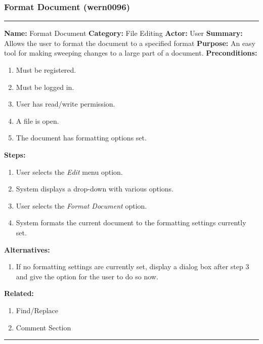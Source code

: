 \documentclass[11pt]{report}
\begin{document}
\subsubsection{Format Document (wern0096)}
\vspace{2pt}
\hrule
\vspace{8pt}
	\noindent\textbf{Name:} Format Document \newline
	\textbf{Category:} File Editing \newline
	\textbf{Actor:} User \newline
	\textbf{Summary:} Allows the user to format the document to a specified format \newline
	\textbf{Purpose:} An easy tool for making sweeping changes to a large part of a document. \newline
	\textbf{Preconditions:}
	\begin{enumerate}
		\item Must be registered.
		\item Must be logged in.
		\item User has read/write permission.
		\item A file is open.
		\item The document has formatting options set.
	\end{enumerate}
	\textbf{Steps:}
	\begin{enumerate}
		\item User selects the \textit{Edit} menu option.
		\item System displays a drop-down with various options.
		\item User selects the \textit{Format Document} option.
		\item System formats the current document to the formatting settings currently set.
	\end{enumerate}
	\textbf{Alternatives:}
	\begin{enumerate}
		\item If no formatting settings are currently set, display a dialog box after step 3 and give the option for the user to do so now.
	\end{enumerate}
	\textbf{Related:}
	\begin{enumerate}
		\item Find/Replace
		\item Comment Section
	\end{enumerate}
\vspace{8pt}
\hrule
\newpage
\end{document}
